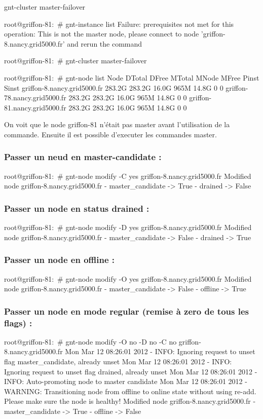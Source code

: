 gnt-cluster master-failover

root@griffon-81:~# gnt-instance list
Failure: prerequisites not met for this operation:
This is not the master node, please connect to node 'griffon-8.nancy.grid5000.fr' and rerun the command

root@griffon-81:~# gnt-cluster master-failover

root@griffon-81:~# gnt-node list
Node                         DTotal  DFree MTotal MNode MFree Pinst Sinst
griffon-8.nancy.grid5000.fr  283.2G 283.2G  16.0G  965M 14.8G     0     0
griffon-78.nancy.grid5000.fr 283.2G 283.2G  16.0G  965M 14.8G     0     0
griffon-81.nancy.grid5000.fr 283.2G 283.2G  16.0G  965M 14.8G     0     0

On voit que le node griffon-81 n'était pas master avant l'utilisation de la commande. Ensuite il est possible d'executer les commandes master.

\subsubsection {Passer un neud en master-candidate :}

root@griffon-81:~# gnt-node modify -C yes griffon-8.nancy.grid5000.fr
Modified node griffon-8.nancy.grid5000.fr
 - master_candidate -> True
 - drained -> False

\subsubsection {Passer un node en status drained :}

root@griffon-81:~# gnt-node modify -D yes griffon-8.nancy.grid5000.fr
Modified node griffon-8.nancy.grid5000.fr
 - master_candidate -> False
 - drained -> True

\subsubsection {Passer un node en offline :}

root@griffon-81:~# gnt-node modify -O yes griffon-8.nancy.grid5000.fr
Modified node griffon-8.nancy.grid5000.fr
 - master_candidate -> False
 - offline -> True

\subsubsection {Passer un node en mode regular (remise à zero de tous les flags) :}

root@griffon-81:~# gnt-node modify -O no -D no -C no griffon-8.nancy.grid5000.fr
Mon Mar 12 08:26:01 2012  - INFO: Ignoring request to unset flag master_candidate, already unset
Mon Mar 12 08:26:01 2012  - INFO: Ignoring request to unset flag drained, already unset
Mon Mar 12 08:26:01 2012  - INFO: Auto-promoting node to master candidate
Mon Mar 12 08:26:01 2012  - WARNING: Transitioning node from offline to online state without using re-add. Please make sure the node is healthy!
Modified node griffon-8.nancy.grid5000.fr
 - master_candidate -> True
 - offline -> False

